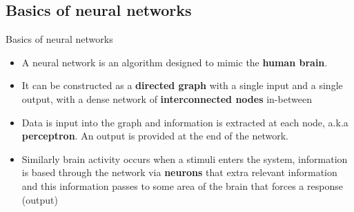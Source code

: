 \documentclass{beamer}
\begin{document}
\subsection{Basics of neural networks}

\begin{frame}{Basics of neural networks}
\begin{minipage}{0.70\linewidth}
\begin{itemize}
\item A neural network is an algorithm designed to mimic the \textbf{human brain}.
\item It can be constructed as a \textbf{directed graph} with a single input and a single output, with a dense network of \textbf{interconnected nodes} in-between
\item Data is input into the graph and information is extracted at each node, a.k.a \textbf{perceptron}. An output is provided at the end of the network.
\item Similarly brain activity occurs when a stimuli enters the system, information is based through the network via \textbf{neurons} that extra relevant information and this information passes to some area of the brain that forces a response (output)
\end{itemize}
\end{minipage}
\begin{minipage}{0.29\linewidth}

\end{minipage}
\end{frame}
\end{document}
